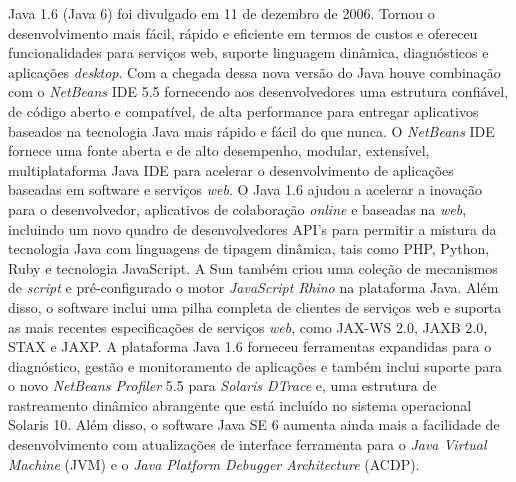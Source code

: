 Java 1.6 (Java 6) foi divulgado em 11 de dezembro de 2006. Tornou o desenvolvimento mais f\'{a}cil, r\'{a}pido e eficiente em termos de custos e ofereceu funcionalidades para serviços web, suporte linguagem din\^{a}mica, diagn\'{o}sticos e aplicaç\~{o}es {\it desktop}. Com a chegada dessa nova vers\~{a}o do Java houve combinaç\~{a}o com o {\it NetBeans} IDE 5.5 fornecendo aos desenvolvedores uma estrutura confi\'{a}vel, de c\'{o}digo aberto e compat\'{i}vel, de alta performance para entregar aplicativos baseados na tecnologia Java mais r\'{a}pido e f\'{a}cil do que nunca. O {\it NetBeans} IDE fornece uma fonte aberta e de alto desempenho, modular, extens\'{i}vel, multiplataforma Java IDE para acelerar o desenvolvimento de aplicaç\~{o}es baseadas em software e serviços {\it web}. O Java 1.6 ajudou a acelerar a inovaç\~{a}o para o desenvolvedor, aplicativos de colaboraç\~{a}o {\it online} e baseadas na {\it web}, incluindo um novo quadro de desenvolvedores \acs{API}'s para permitir a mistura da tecnologia Java com linguagens de tipagem din\^{a}mica, tais como PHP, Python, Ruby e tecnologia JavaScript. A Sun tamb\'{e}m criou uma coleç\~{a}o de mecanismos de {\it script} e pr\'{e}-configurado o motor {\it JavaScript Rhino} na plataforma Java. Al\'{e}m disso, o software inclui uma pilha completa de clientes de serviços web e suporta as mais recentes especificaç\~{o}es de serviços {\it web}, como \acs{JAX-WS} 2.0, \acs{JAXB} 2.0, \acs{STAX} e \acs{JAXP}. A plataforma Java 1.6 forneceu ferramentas expandidas para o diagn\'{o}stico, gest\~{a}o e monitoramento de aplicaç\~{o}es e tamb\'{e}m inclui suporte para o novo {\it NetBeans Profiler} 5.5 para {\it Solaris DTrace } e, uma estrutura de rastreamento din\^{a}mico abrangente que est\'{a} inclu\'{i}do no sistema operacional Solaris 10. Al\'{e}m disso, o software Java SE 6 aumenta ainda mais a facilidade de desenvolvimento com atualizaç\~{o}es de interface ferramenta para o {\it Java Virtual Machine} (\acs{JVM}) e o {\it Java Platform Debugger Architecture} (\acs{ACDP}).

